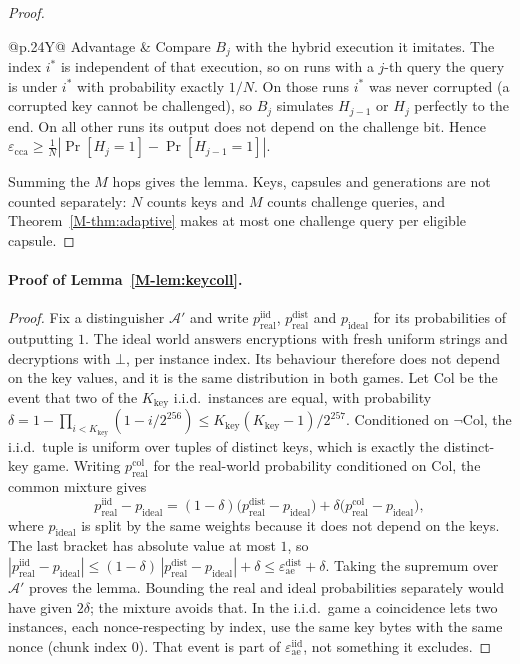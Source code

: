 \documentclass[pdflatex,sn-mathphys-num]{sn-jnl}
\theoremstyle{plain}
\begin{document}
\begin{proof}
\begin{table}[htbp]
\begin{tabularx}{\linewidth}{@{}p{.24\linewidth}Y@{}}
Advantage & Compare $B_j$ with the hybrid execution it imitates. The index $i^*$ is independent of that execution, so on runs with a $j$-th query the query is under $i^*$ with probability exactly $1/N$. On those runs $i^*$ was never corrupted (a corrupted key cannot be challenged), so $B_j$ simulates $H_{j-1}$ or $H_j$ perfectly to the end. On all other runs its output does not depend on the challenge bit. Hence $\varepsilon_{\mathrm{cca}}\ge\frac1N|\Pr[H_j=1]-\Pr[H_{j-1}=1]|$.\\\bottomrule
\end{tabularx}
\end{table}

Summing the $M$ hops gives the lemma. Keys, capsules and generations are not counted separately: $N$ counts keys and $M$ counts challenge queries, and Theorem~\ref{M-thm:adaptive} makes at most one challenge query per eligible capsule.
\end{proof}

\paragraph{Proof of Lemma~\ref{M-lem:keycoll}.}
\begin{proof}
Fix a distinguisher $\mathcal A'$ and write $p^{\mathrm{iid}}_{\mathrm{real}}$, $p^{\mathrm{dist}}_{\mathrm{real}}$ and $p_{\mathrm{ideal}}$ for its probabilities of outputting $1$. The ideal world answers encryptions with fresh uniform strings and decryptions with $\bot$, per instance index. Its behaviour therefore does not depend on the key values, and it is the same distribution in both games. Let $\mathrm{Col}$ be the event that two of the $K_{\mathrm{key}}$ i.i.d.\ instances are equal, with probability $\delta=1-\prod_{i<K_{\mathrm{key}}}(1-i/2^{256})\le K_{\mathrm{key}}(K_{\mathrm{key}}-1)/2^{257}$. Conditioned on $\neg\mathrm{Col}$, the i.i.d.\ tuple is uniform over tuples of distinct keys, which is exactly the distinct-key game. Writing $p^{\mathrm{col}}_{\mathrm{real}}$ for the real-world probability conditioned on $\mathrm{Col}$, the common mixture gives
\[
 p^{\mathrm{iid}}_{\mathrm{real}}-p_{\mathrm{ideal}}=(1-\delta)\big(p^{\mathrm{dist}}_{\mathrm{real}}-p_{\mathrm{ideal}}\big)+\delta\big(p^{\mathrm{col}}_{\mathrm{real}}-p_{\mathrm{ideal}}\big),
\]
where $p_{\mathrm{ideal}}$ is split by the same weights because it does not depend on the keys. The last bracket has absolute value at most $1$, so $|p^{\mathrm{iid}}_{\mathrm{real}}-p_{\mathrm{ideal}}|\le(1-\delta)\,|p^{\mathrm{dist}}_{\mathrm{real}}-p_{\mathrm{ideal}}|+\delta\le\varepsilon^{\mathrm{dist}}_{\mathrm{ae}}+\delta$. Taking the supremum over $\mathcal A'$ proves the lemma. Bounding the real and ideal probabilities separately would have given $2\delta$; the mixture avoids that. In the i.i.d.\ game a coincidence lets two instances, each nonce-respecting by index, use the same key bytes with the same nonce (chunk index $0$). That event is part of $\varepsilon^{\mathrm{iid}}_{\mathrm{ae}}$, not something it excludes.
\end{proof}
\end{document}
